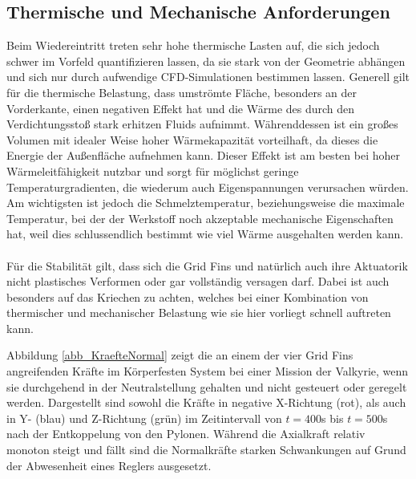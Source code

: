 \subsection{Thermische und Mechanische Anforderungen}
Beim Wiedereintritt treten sehr hohe thermische Lasten auf, die sich jedoch schwer im Vorfeld quantifizieren lassen, da sie stark von der Geometrie abhängen und sich nur durch aufwendige CFD-Simulationen bestimmen lassen. Generell gilt für die thermische Belastung, dass umströmte Fläche, besonders an der Vorderkante, einen negativen Effekt hat und die Wärme des durch den Verdichtungsstoß stark erhitzen Fluids aufnimmt. Währenddessen ist ein großes Volumen mit idealer Weise hoher Wärmekapazität vorteilhaft, da dieses die Energie der Außenfläche aufnehmen kann. Dieser Effekt ist am besten bei hoher Wärmeleitfähigkeit nutzbar und sorgt für möglichst geringe Temperaturgradienten, die wiederum auch Eigenspannungen verursachen würden. Am wichtigsten ist jedoch die Schmelztemperatur, beziehungsweise die maximale Temperatur, bei der der Werkstoff noch akzeptable mechanische Eigenschaften hat, weil dies schlussendlich bestimmt wie viel Wärme ausgehalten werden kann.
\\~\\
Für die Stabilität gilt, dass sich die Grid Fins und natürlich auch ihre Aktuatorik nicht plastisches Verformen oder gar vollständig versagen darf. Dabei ist auch besonders auf das Kriechen zu achten, welches bei einer Kombination von thermischer und mechanischer Belastung wie sie hier vorliegt schnell auftreten kann.

Abbildung \ref{abb_KraefteNormal} zeigt die an einem der vier Grid Fins angreifenden Kräfte im Körperfesten System bei einer Mission der Valkyrie, wenn sie durchgehend in der Neutralstellung gehalten und nicht gesteuert oder geregelt werden. Dargestellt sind sowohl die Kräfte in negative X-Richtung (rot), als auch in Y- (blau) und Z-Richtung (grün) im Zeitintervall von $t=400$s bis $t=500$s nach der Entkoppelung von den Pylonen. Während die Axialkraft relativ monoton steigt und fällt sind die Normalkräfte starken Schwankungen auf Grund der Abwesenheit eines Reglers ausgesetzt.

